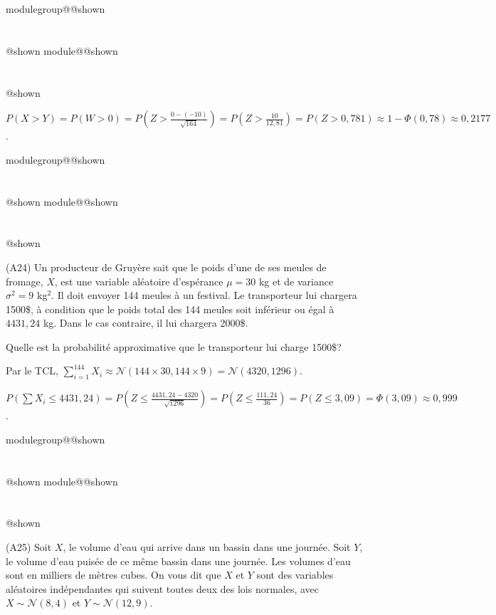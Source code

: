 \documentclass{Evaluation}
\makeatletter
\newcommand{\currentmodulekey}{}
\newcommand{\currentmoduletitle}{}
\newcommand{\currentgroupkey}{}
\newcommand{\currentgrouptitle}{}
\newcommand{\showmoduleifneeded}{%
  \ifx\currentgroupkey\empty\else
    \expandafter\ifx\csname modulegroup@\currentgroupkey @shown\endcsname\relax
      \section*{\currentgrouptitle}%
      \expandafter\gdef\csname modulegroup@\currentgroupkey @shown\endcsname{1}%
    \fi
  \fi
  \expandafter\ifx\csname module@\currentmodulekey @shown\endcsname\relax
    \section*{\currentmoduletitle}%
    \expandafter\gdef\csname module@\currentmodulekey @shown\endcsname{1}%
  \fi
}
\newenvironment{A24}{\showmoduleifneeded}{}
\newenvironment{A25}{\showmoduleifneeded}{}
\makeatother
\begin{document}
\begin{questions}
\begin{A24}
\begin{solution}
    $P(X>Y)=P(W>0)=P\left(Z>\frac{0-(-10)}{\sqrt{164}}\right)=P\left(Z>\frac{10}{12,81}\right)=P(Z>0,781)\approx 1-\Phi(0,78)\approx 0,2177$.
\end{solution}
\end{A24}

\begin{A24}
\question (A24) Un producteur de Gruyère sait que le poids d'une de ses meules de fromage, $X$, est une variable aléatoire d'espérance $\mu=30$ kg et de variance $\sigma^2 = 9$ kg$^2$. 
Il doit envoyer 144 meules à un festival. 
Le transporteur lui chargera 1500\$, à condition que le poids total des 144 meules soit inférieur ou égal à $4431,24$ kg. 
Dans le cas contraire, il lui chargera 2000\$.

Quelle est la probabilité approximative que le transporteur lui charge 1500\$?

\begin{solution}
    Par le TCL, $\sum_{i=1}^{144}X_i \approx \mathcal{N}(144\times 30, 144\times 9)=\mathcal{N}(4320, 1296)$.

    $P\left(\sum X_i\leq 4431,24\right)=P\left(Z\leq\frac{4431,24-4320}{\sqrt{1296}}\right)=P\left(Z\leq\frac{111,24}{36}\right)=P(Z\leq 3,09)=\Phi(3,09)\approx 0,999$.
\end{solution}
\end{A24}
    

\begin{A25}
\question (A25) Soit $X$, le volume d'eau qui arrive dans un bassin dans une journée. Soit $Y$, le volume d'eau puisée de ce même bassin dans une journée. 
Les volumes d'eau sont en milliers de mètres cubes. 
On vous dit que $X$ et $Y$ sont des variables aléatoires indépendantes qui suivent toutes deux des lois normales, avec 
$X\sim \mathcal{N}(8,4)$ et $Y\sim \mathcal{N}(12,9)$.

\end{A25}
\end{questions}
\end{document}
